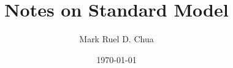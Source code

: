 \documentclass[b5paper,12pt]{book}
\begin{document}
\author{Mark Ruel D. Chua}
\title{Notes on Standard Model}
\date{\today}

\frontmatter
\maketitle

\tableofcontents

\mainmatter



\backmatter
\end{document}
